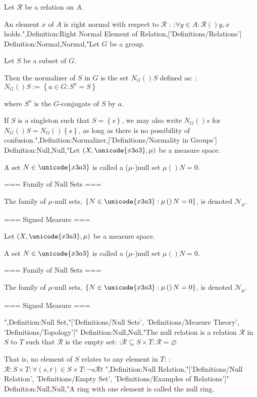 Let $\mathcal R$ be a relation on $A$.


An element $x$ of $A$ is right normal with respect to $\mathcal R$ :
:$\forall y \in A: \mathcal R \left(   \right){y, x}$ holds.",Definition:Right Normal Element of Relation,['Definitions/Relations']
Definition:Normal,Normal,"Let $G$ be a group.

Let $S$ be a subset of $G$.


Then the normalizer of $S$ in $G$ is the set $N_G \left(   \right)S$ defined as:
:$N_G \left(   \right)S := \left\lbrace a \in G: S^a = S \right\rbrace$

where $S^a$ is the $G$-conjugate of $S$ by $a$.


If $S$ is a singleton such that $S = \left\lbrace s \right\rbrace$, we may also write $N_G \left(   \right)s$ for $N_G \left(   \right)S = N_G \left(   \right){\left\lbrace s \right\rbrace}$, as long as there is no possibility of confusion.",Definition:Normalizer,['Definitions/Normality in Groups']
Definition:Null,Null,"Let $\left( X, \unicode{x3a3}, \mu \right)$ be a measure space.

A set $N \in \unicode{x3a3}$ is called a ($\mu$-)null set  $\mu \left(   \right)N = 0$.




=== Family of Null Sets ===

The family of $\mu$-null sets, $\left\lbrace N \in \unicode{x3a3}: \mu \left(   \right)N = 0 \right\rbrace$, is denoted $\mathcal N_\mu$. 


=== Signed Measure ===

Let $\left( X, \unicode{x3a3}, \mu \right)$ be a measure space.

A set $N \in \unicode{x3a3}$ is called a ($\mu$-)null set  $\mu \left(   \right)N = 0$.




=== Family of Null Sets ===

The family of $\mu$-null sets, $\left\lbrace N \in \unicode{x3a3}: \mu \left(   \right)N = 0 \right\rbrace$, is denoted $\mathcal N_\mu$. 


=== Signed Measure ===

",Definition:Null Set,"['Definitions/Null Sets', 'Definitions/Measure Theory', 'Definitions/Topology']"
Definition:Null,Null,"The null relation is a relation $\mathcal R$ in $S$ to $T$ such that $\mathcal R$ is the empty set:
:$\mathcal R \subseteq S \times T: \mathcal R = \varnothing$


That is, no element of $S$ relates to any element in $T$:
:$\mathcal R: S \times T: \forall \left( s, t \right) \in S \times T: \neg s \mathrel \mathcal R t$
",Definition:Null Relation,"['Definitions/Null Relation', 'Definitions/Empty Set', 'Definitions/Examples of Relations']"
Definition:Null,Null,"A ring with one element is called the null ring.

